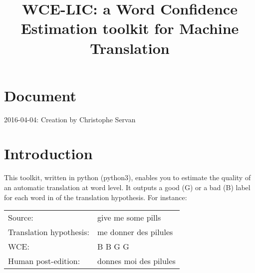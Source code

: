 \documentclass[a4paper,12pt]{article}
\title{WCE-LIC: a Word Confidence Estimation toolkit for Machine Translation}
\begin{document}
  \maketitle

  
  \section*{Document}
  2016-04-04: Creation by Christophe Servan
  \pagebreak
\tableofcontents
  \pagebreak


\section{Introduction}

This toolkit, written in python (python3), enables you to estimate the quality 
of an automatic translation at word level. It outputs a good (G) or a bad (B) 
label for each word in of the translation hypothesis.
For instance:


\begin{table}[h!]
\centering
\begin{tabular}{ll}
\hline
Source: & give me some pills \\
Translation hypothesis: & me donner des pilules \\
WCE: & B B G G \\
Human post-edition: & donnes moi des pilules \\
\hline
\end{tabular}
\end{table}
\end{document}
